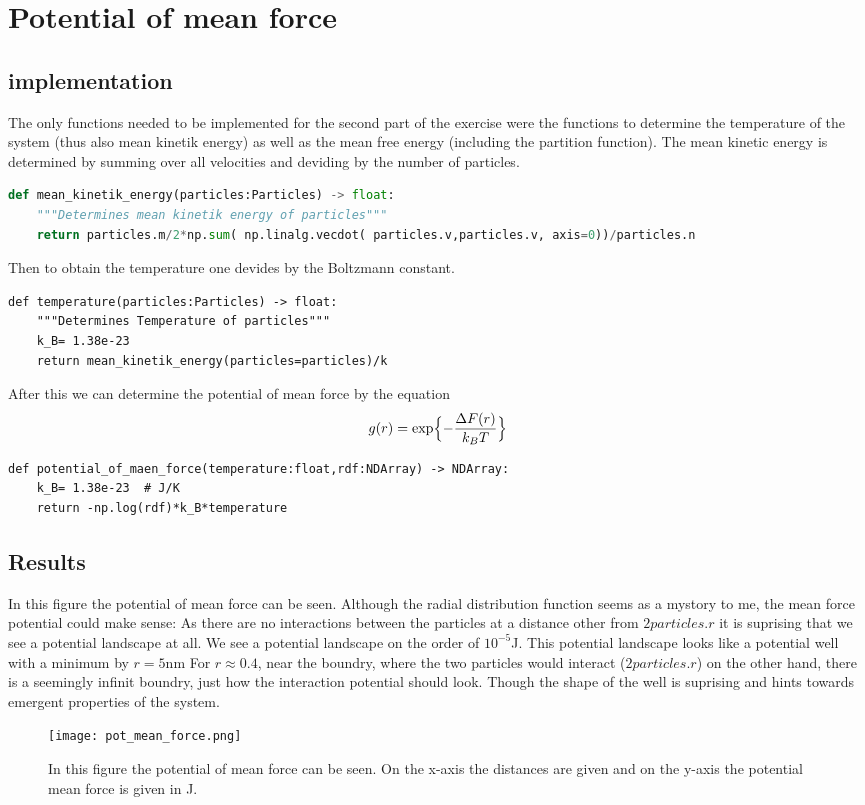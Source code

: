 \documentclass{article}[a4paper]
\begin{document}
\section{Potential of mean force}
\subsection{implementation}
The only functions needed to be implemented for the second part of the exercise were the functions to determine the temperature of the system (thus also mean kinetik energy) as well as the mean free energy (including the partition function).
The mean kinetic energy is determined by summing over all velocities and deviding by the number of particles.
\begin{lstlisting}[language=Python]
def mean_kinetik_energy(particles:Particles) -> float:
    """Determines mean kinetik energy of particles"""
    return particles.m/2*np.sum( np.linalg.vecdot( particles.v,particles.v, axis=0))/particles.n
\end{lstlisting}
Then to obtain the temperature one devides by the Boltzmann constant.
\begin{lstlisting}
def temperature(particles:Particles) -> float:
    """Determines Temperature of particles"""
    k_B= 1.38e-23  
    return mean_kinetik_energy(particles=particles)/k
\end{lstlisting}
After this we can determine the potential of mean force by the equation
\begin{equation}
    g(r)= \exp \Bigl\{-\frac{\Delta F(r)}{k_B T}\Bigr\}
\end{equation}
\begin{lstlisting}
def potential_of_maen_force(temperature:float,rdf:NDArray) -> NDArray:
    k_B= 1.38e-23  # J/K
    return -np.log(rdf)*k_B*temperature   
\end{lstlisting}

\subsection{Results}
In this figure the potential of mean force can be seen.
Although the radial distribution function seems as a mystory to me, the mean force potential could make sense: 
As there are no interactions between the particles at a distance other from $2\textit{particles.r}$ it is suprising that we see a potential landscape at all.
We see a potential landscape on the order of $10^{-5}$J.
This potential landscape looks like a potential well with a minimum by $r=5$nm
For $r\approx0.4$, near the boundry, where the two particles would interact ($2\textit{particles.r}$) on the other hand, there is a seemingly infinit boundry, just how the interaction potential should look. Though the shape of the well is suprising and hints towards emergent properties of the system.
\begin{figure}[h!]
    \centering
    \texttt{[image: pot\_mean\_force.png]}
    \caption{In this figure the potential of mean force can be seen. On the x-axis the distances are given and on the y-axis the potential mean force is given in J.}
\end{figure}
\end{document}
